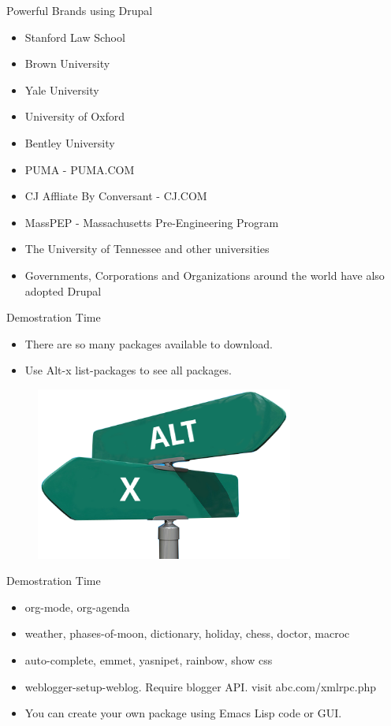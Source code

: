 \documentclass[english,12pt,presentation]{beamer}
\begin{document}
\begin{frame}{Powerful Brands using Drupal}
\begin{itemize}
\pause \item Stanford Law School
\pause \item Brown University
\pause \item Yale University
\pause \item University of Oxford
\pause \item Bentley University
\pause \item PUMA - PUMA.COM
\pause \item CJ Affliate By Conversant - CJ.COM
\pause \item MassPEP - Massachusetts Pre-Engineering Program
\pause \item The University of Tennessee and other universities
\pause \item Governments, Corporations and Organizations around the world have also adopted Drupal
\end{itemize}
\end{frame}

\begin{frame}{Demostration Time}
\begin{itemize}
\pause \item There are so many packages available to download.
\pause \item Use Alt-x list-packages to see all packages.
\end{itemize}
\begin{figure}
\centering
\includegraphics[width=320]{images/altx.png}
\end{figure}
\end{frame}

\begin{frame}{Demostration Time}
\begin{itemize}
\pause \item org-mode, org-agenda
\pause \item weather, phases-of-moon, dictionary, holiday, chess, doctor, macroc
\pause \item auto-complete, emmet, yasnipet, rainbow, show css
\pause \item weblogger-setup-weblog. Require blogger API. visit abc.com/xmlrpc.php
\pause \item You can create your own package using Emacs Lisp code or GUI.
\end{itemize}
\end{frame}
\end{document}
